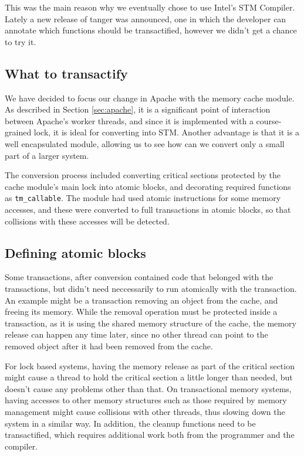 \documentclass[preprint,natbib,11pt]{sigplanconf}
\begin{document}
This was the main reason why we eventually chose to use Intel's STM Compiler.
Lately a new release of tanger was announced, one in which the developer can
annotate which functions should be transactified, however we didn't get a
chance to try it.

\subsection{What to transactify}
We have decided to focus our change in Apache with the memory cache module. As
described in Section \ref{sec:apache}, it is a significant point of interaction
between Apache's worker threads, and since it is implemented with a course-grained
lock, it is ideal for converting into STM. Another advantage is that it is a
well encapsulated module, allowing us to see how can we convert only a small
part of a larger system.

The conversion process included converting critical sections protected by the
cache module's main lock into atomic blocks, and decorating required functions
as {\tt tm\_callable}. The module had used atomic instructions for some memory
accesses, and these were converted to full transactions in atomic blocks, so
that collisions with these accesses will be detected.

\subsection{Defining atomic blocks}
Some transactions, after conversion contained code that belonged with the
transactions, but didn't need neccessarily to run atomically with the
transaction. An example might be a transaction removing an object from the
cache, and freeing its memory. While the removal operation must be protected
inside a transaction, as it is using the shared memory structure of the cache,
the memory release can happen any time later, since no other thread can point to
the removed object after it had been removed from the cache. 

For lock based systems, having the memory release as part of the critical
section might cause a thread to hold the critical section a little longer than
needed, but doesn't cause any problems other than that. On transactional memory
systems, having accesses to other memory structures such as those required by
memory management might cause collisions with other threads, thus slowing down
the system in a similar way. In addition, the cleanup functions need to be
transactified, which requires additional work both from the programmer and the
compiler.
\end{document}
